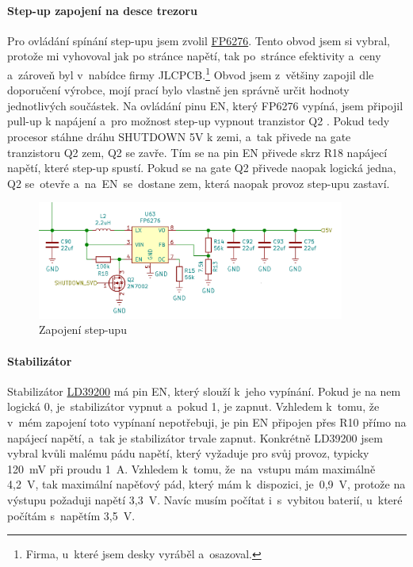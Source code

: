\vspace{-5mm}

\paragraph*{Step-up zapojení na desce trezoru} Pro ovládání spínání step-upu jsem zvolil \href{https://datasheet.lcsc.com/szlcsc/Feeling-Tech-FP6276AXR-G1_C83308.pdf}{FP6276}.
Tento obvod jsem si vybral, protože mi vyhovoval jak po stránce napětí, tak po~stránce efektivity a~ceny a~zároveň byl v~nabídce firmy JLCPCB.\footnote{Firma, u~které jsem desky vyráběl a~osazoval.}
Obvod jsem z~většiny zapojil dle doporučení výrobce, mojí prací bylo vlastně jen správně určit hodnoty 
jednotlivých součástek. Na ovládání pinu EN, který FP6276 vypíná, jsem připojil pull-up k napájení a~pro možnost step-up vypnout tranzistor Q2 \parencite{cj3134k}. 
Pokud tedy procesor stáhne dráhu SHUTDOWN 5V k zemi, a~tak přivede na gate tranzistoru Q2 zem, 
Q2 se zavře. Tím se na pin EN přivede skrz R18 napájecí napětí, které step-up spustí. 
Pokud se na gate Q2 přivede naopak logická jedna, Q2 se~otevře a~na~EN~se~dostane zem, která naopak provoz step-upu zastaví.
\vspace{-5mm}
\begin{figure}[h]
    \centering
    \includegraphics[width=0.9\textwidth]{kapitoly/obrazky/E4/napajeni/step-up.png}
    \caption{Zapojení step-upu}
    \label{fig:E4-step-up}
\end{figure}

\paragraph*{Stabilizátor}

Stabilizátor \href{https://datasheet.lcsc.com/szlcsc/1808280153_STMicroelectronics-LD39200PU33R_C222192.pdf}{LD39200} \parencite{ld39200} má pin EN, který slouží k~je\-ho vypínání. 
Pokud je na nem logická 0, je~stabilizátor vypnut a~pokud 1, je zapnut. Vzhledem k~tomu, že v~mém zapojení toto vypínaní nepotřebuji, je pin EN připojen 
přes R10 přímo na napájecí napětí, a~tak je stabilizátor trvale zapnut.
Konkrétně LD39200 jsem vybral kvůli malému pádu napětí, který vyžaduje pro svůj provoz, typicky 120~mV při proudu 1~A. Vzhledem k~tomu, že~na~vstupu 
mám maximálně 4,2~V, tak maximální napěťový pád, který mám k~dispozici, je~0,9~V, protože na výstupu požaduji napětí 3,3~V. Navíc musím počítat 
i~s~vybitou baterií, u~které počítám s~napětím 3,5~V. %

